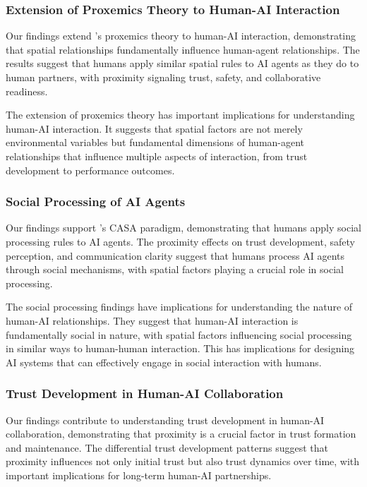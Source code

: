 \documentclass[12pt]{article}
\begin{document}
\subsubsection{Extension of Proxemics Theory to Human-AI Interaction}

Our findings extend \citeauthor{hall1966hidden}'s \citeyear{hall1966hidden} proxemics theory to human-AI interaction, demonstrating that spatial relationships fundamentally influence human-agent relationships. The results suggest that humans apply similar spatial rules to AI agents as they do to human partners, with proximity signaling trust, safety, and collaborative readiness.

The extension of proxemics theory has important implications for understanding human-AI interaction. It suggests that spatial factors are not merely environmental variables but fundamental dimensions of human-agent relationships that influence multiple aspects of interaction, from trust development to performance outcomes.

\subsubsection{Social Processing of AI Agents}

Our findings support \citeauthor{nass2000machines}'s \citeyear{nass2000machines} CASA paradigm, demonstrating that humans apply social processing rules to AI agents. The proximity effects on trust development, safety perception, and communication clarity suggest that humans process AI agents through social mechanisms, with spatial factors playing a crucial role in social processing.

The social processing findings have implications for understanding the nature of human-AI relationships. They suggest that human-AI interaction is fundamentally social in nature, with spatial factors influencing social processing in similar ways to human-human interaction. This has implications for designing AI systems that can effectively engage in social interaction with humans.

\subsubsection{Trust Development in Human-AI Collaboration}

Our findings contribute to understanding trust development in human-AI collaboration, demonstrating that proximity is a crucial factor in trust formation and maintenance. The differential trust development patterns suggest that proximity influences not only initial trust but also trust dynamics over time, with important implications for long-term human-AI partnerships.
\end{document}
